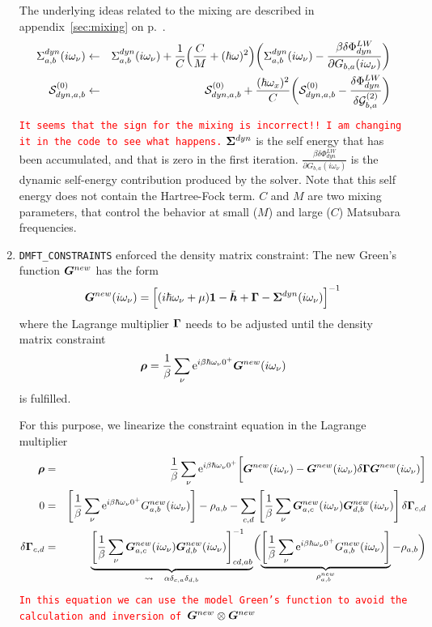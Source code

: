 \documentclass[11pt,a4paper]{report}
\newcommand{\petertt}[1]{\textcolor{red}{\texttt{#1}}}
\begin{document}
\begin{enumerate}
  The underlying ideas related to the mixing are described in
  appendix~\ref{sec:mixing} on p.~\pageref{sec:mixing}.
  \begin{eqnarray}
    \Sigma^{dyn}_{a,b}(i\omega_\nu)
&\leftarrow&\Sigma^{dyn}_{a,b}(i\omega_\nu)
+\frac{1}{C}\Bigl(\frac{C}{M}+(\hbar\omega)^2\Bigr)
\biggl(\Sigma^{dyn}_{a,b}(i\omega_\nu)
-\frac{\beta\delta\Phi^{LW}_{dyn}}{\partial G_{b,a}(i\omega_\nu)}
\biggr)
\nonumber\\
   \mathcal{\bm{S}}_{dyn,a,b}^{(0)}&\leftarrow&\mathcal{\bm{S}}_{dyn,a,b}^{(0)}
+\frac{(\hbar\omega_x)^2}{C}\biggl(\mathcal{\bm{S}}_{dyn,a,b}^{(0)}
-\frac{\delta\Phi^{LW}_{dyn}}{\delta\mathcal{G}^{(2)}_{b,a}}\biggr)
\end{eqnarray}
\petertt{It seems that the sign for the mixing is incorrect!! I am
  changing it in the code to see what happens.}  $\bm{\Sigma}^{dyn}$
is the self energy that has been accumulated, and that is zero in the
first iteration. $\frac{\beta\delta\Phi^{LW}_{dyn}} {\partial
  G_{b,a}(i\omega_\nu)}$ is the dynamic self-energy contribution
produced by the solver. Note that this self energy does not contain
the Hartree-Fock term. $C$ and $M$ are two mixing parameters, that
control the behavior at small ($M$) and large ($C$) Matsubara
frequencies.
%
\item \verb|DMFT_CONSTRAINTS| enforced the density matrix constraint:
  The new Green's function $\bm{G}^{new}$ has the form
\begin{eqnarray}
\bm{G}^{new}(i\omega_\nu)=\Bigl[(i\hbar\omega_\nu+\mu)\bm{1}
-\bar{\bm{h}}+\bm{\Gamma}
-\bm{\Sigma}^{dyn}(i\omega_\nu)
\Bigr]^{-1}
\end{eqnarray}
where the Lagrange multiplier $\bm{\Gamma}$ needs to be adjusted until
the density matrix constraint
\begin{eqnarray}
\bm{\rho}=\frac{1}{\beta}\sum_\nu 
\mathrm{e}^{i\beta\hbar\omega_\nu0^+}\bm{G}^{new}(i\omega_\nu)
\end{eqnarray}
is fulfilled. 

For this purpose, we linearize the constraint equation in the Lagrange
multiplier
\begin{eqnarray}
\bm{\rho}&=&\frac{1}{\beta}\sum_\nu 
\mathrm{e}^{i\beta\hbar\omega_\nu0^+}
\biggl[
\bm{G}^{new}(i\omega_\nu)-\bm{G}^{new}(i\omega_\nu)\delta\bm{\Gamma}
\bm{G}^{new}(i\omega_\nu)\biggr]
\nonumber\\
0&=&\left[\frac{1}{\beta}\sum_\nu \mathrm{e}^{i\beta\hbar\omega_\nu0^+}
G^{new}_{a,b}(i\omega_\nu)\right]-\rho_{a,b}
-\sum_{c,d}\left[
\frac{1}{\beta}\sum_\nu 
\bm{G}^{new}_{a,c}(i\omega_\nu)\bm{G}^{new}_{d,b}(i\omega_\nu)\right]
\delta\bm{\Gamma}_{c,d}
\nonumber\\
\delta\bm{\Gamma}_{c,d}
&=&
\underbrace{
\left[
\frac{1}{\beta}\sum_\nu 
\bm{G}^{new}_{a,c}(i\omega_\nu)\bm{G}^{new}_{d,b}(i\omega_\nu)
\right]^{-1}_{cd,ab}
}_{\leadsto\quad \alpha\delta_{c,a}\delta_{d,b}}
\biggl(
\underbrace{\left[\frac{1}{\beta}\sum_\nu \mathrm{e}^{i\beta\hbar\omega_\nu0^+}
G^{new}_{a,b}(i\omega_\nu)\right]}_{\rho^{new}_{a,b}}-\rho_{a,b}
\biggr)
\end{eqnarray}
\petertt{In this equation we can use the model Green's function to
  avoid the calculation and inversion of
  $\bm{G}^{new}\otimes\bm{G}^{new}$}


\end{enumerate}
\end{document}
